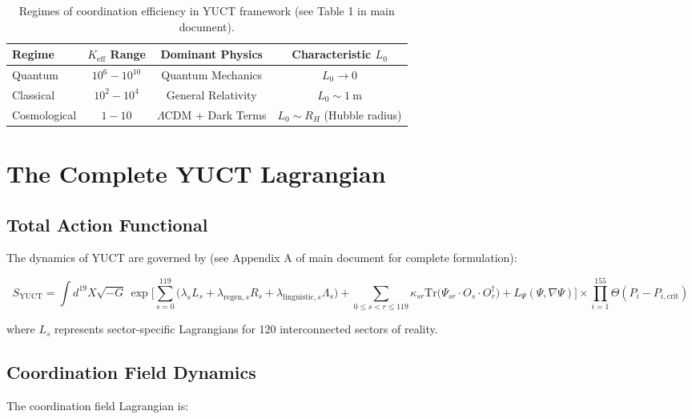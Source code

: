 \documentclass[12pt,a4paper]{article}
\theoremstyle{remark}
\newcommand{\Keff}{K_{\mathrm{eff}}}
\begin{document}
	\begin{table}[htbp]
		\centering
		\begin{tabular}{lccc}
			\toprule
			\textbf{Regime} & \textbf{$\Keff$ Range} & \textbf{Dominant Physics} & \textbf{Characteristic $L_0$} \\
			\midrule
			Quantum & $10^6 - 10^{10}$ & Quantum Mechanics & $L_0 \to 0$ \\
			Classical & $10^2 - 10^4$ & General Relativity & $L_0 \sim 1\ \text{m}$ \\
			Cosmological & $1 - 10$ & $\Lambda$CDM + Dark Terms & $L_0 \sim R_H$ (Hubble radius) \\
			\bottomrule
		\end{tabular}
		\caption{Regimes of coordination efficiency in YUCT framework (see Table 1 in main document).}
		\label{tab:keff-regimes}
	\end{table}
	
	\section{The Complete YUCT Lagrangian}
	\label{sec:yuct-lagrangian}
	
	\subsection{Total Action Functional}
	
	The dynamics of YUCT are governed by (see Appendix A of main document for complete formulation):
	
	\begin{equation}
		S_{\text{YUCT}} = \int d^{19}X \sqrt{-G} \,
		\exp\Bigg[
		\sum_{s=0}^{119} \big(
		\lambda_s L_s + \lambda_{\text{regen},s} R_s + 
		\lambda_{\text{linguistic},s} \Lambda_s
		\big)
		+ \sum_{0 \le s < r \le 119} \kappa_{sr} \mathrm{Tr}\big(
		\Psi_{sr} \cdot O_s \cdot O_r^\dagger
		\big)
		+ L_{\Psi}(\Psi,\nabla\Psi)
		\Bigg]
		\times \prod_{i=1}^{155} \Theta(P_i - P_{i,\text{crit}})
	\end{equation}
	
	where $L_s$ represents sector-specific Lagrangians for 120 interconnected sectors of reality.
	
	\subsection{Coordination Field Dynamics}
	
	The coordination field Lagrangian is:
	
\end{document}
